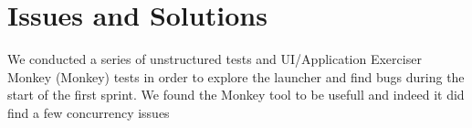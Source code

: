 
\section{Issues and Solutions}

We conducted a series of unstructured tests and UI/Application Exerciser Monkey (Monkey) tests in order to explore the launcher and find bugs during the start of the first sprint. We found the Monkey tool to be usefull and indeed it did find a few concurrency issues 